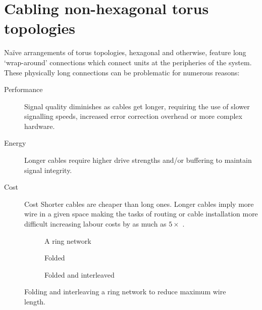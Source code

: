 	\section{Cabling non-hexagonal torus topologies}
		
		Na\"ive arrangements of torus topologies, hexagonal and otherwise, feature
		long `wrap-around' connections which connect units at the peripheries of
		the system. These physically long connections can be problematic for
		numerous reasons:
		
		\begin{description}
			
			\item[Performance] Signal quality diminishes as cables get longer,
			requiring the use of slower signalling speeds, increased error
			correction overhead or more complex hardware.
			
			\item[Energy] Longer cables require higher drive strengths and/or
			buffering to maintain signal integrity.
			
			\item[Cost] Cost Shorter cables are cheaper than long ones.  Longer
			cables imply more wire in a given space making the tasks of routing or
			cable installation more difficult increasing labour costs by as much as
			$5\times$ \cite{curtis12}.
			
		\end{description}
		
		\begin{figure}
			\center
			\begin{subfigure}[b]{0.39\linewidth}
				\center
				\caption{A ring network}
				\label{fig:ring-folding-row}
			\end{subfigure}
			\begin{subfigure}[b]{0.24\linewidth}
				\center
				\caption{Folded}
				\label{fig:ring-folding-folded}
			\end{subfigure}
			\begin{subfigure}[b]{0.35\linewidth}
				\center
				\caption{Folded and interleaved}
				\label{fig:ring-folding-interleaved}
			\end{subfigure}
			
			\caption{Folding and interleaving a ring network to reduce maximum wire
			length.}
			\label{fig:ring-folding}
		\end{figure}
		
